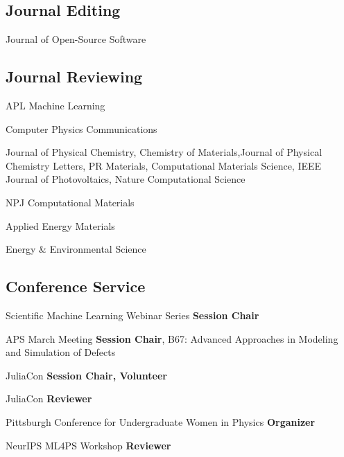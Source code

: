 \subsection{Journal Editing}
{}
{Journal of Open-Source Software}
{}

\vspace{-2mm}
\subsection{Journal Reviewing}
                      {}
                      {APL Machine Learning}
                      {}

{}
{Computer Physics Communications}
{}

{}
{Journal of Physical Chemistry, Chemistry of Materials,Journal of Physical Chemistry Letters, PR Materials, Computational Materials Science, IEEE Journal of Photovoltaics, Nature Computational Science}
{}

{}
{NPJ Computational Materials}
{}

{}
{Applied Energy Materials}
{}

{}
{Energy \& Environmental Science}
{}

\vspace{-2mm}
\subsection{Conference Service}
{Scientific Machine Learning Webinar Series}
{\textbf{Session Chair}}
{}

{APS March Meeting}
{\textbf{Session Chair}, B67: Advanced Approaches in Modeling and Simulation of Defects}
{}
\vspace{1mm}

{JuliaCon}
{\textbf{Session Chair, Volunteer}}
{}

{JuliaCon}
{\textbf{Reviewer}}
{}

{Pittsburgh Conference for Undergraduate Women in Physics}
{\textbf{Organizer}}
{}

{NeurIPS ML4PS Workshop}
{\textbf{Reviewer}}
{}

